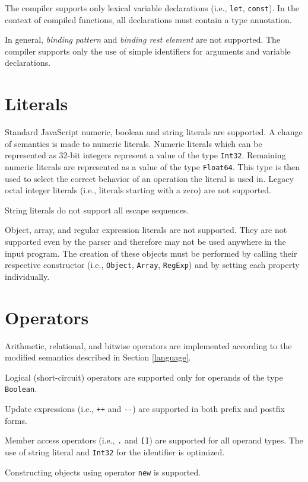 The compiler supports only lexical variable declarations (i.e., \texttt{let}, \texttt{const}). In the context of compiled functions, all declarations must contain a type annotation.

In general, \textit{binding pattern} and \textit{binding rest element} are not supported. The compiler supports only the use of simple identifiers for arguments and variable declarations.


\section{Literals}

Standard JavaScript numeric, boolean and string literals are supported. A change of semantics is made to numeric literals. Numeric literals which can be represented as 32-bit integers represent a value of the type \texttt{Int32}. Remaining numeric literals are represented as a value of the type \texttt{Float64}. This type is then used to select the correct behavior of an operation the literal is used in. Legacy octal integer literals (i.e., literals starting with a zero) are not supported.

String literals do not support all escape sequences.

Object, array, and regular expression literals are not supported. They are not supported even by the parser and therefore may not be used anywhere in the input program. The creation of these objects must be performed by calling their respective constructor (i.e., \texttt{Object}, \texttt{Array}, \texttt{RegExp}) and by setting each property individually.


\section{Operators}

Arithmetic, relational, and bitwise operators are implemented according to the modified semantics described in Section \ref{language}.

Logical (short-circuit) operators are supported only for operands of the type \texttt{Boolean}.

Update expressions (i.e., \texttt{++} and \texttt{{-}{-}}) are supported in both prefix and postfix forms.

Member access operators (i.e., \texttt{.} and \texttt{[]}) are supported for all operand types. The use of string literal and \texttt{Int32} for the identifier is optimized.

Constructing objects using operator \texttt{new} is supported.


